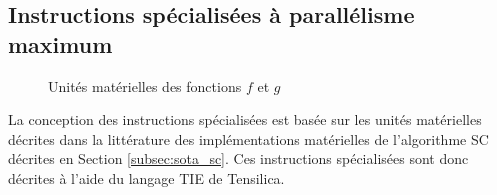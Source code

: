 \subsection{Instructions spécialisées à parallélisme maximum}
\begin{figure}[t]
  \centering
  \caption{Unités matérielles des fonctions $f$ et $g$}
\end{figure}
La conception des instructions spécialisées est basée sur les unités matérielles décrites dans la littérature des implémentations matérielles de l'algorithme SC décrites en Section \ref{subsec:sota_sc}. Ces instructions spécialisées sont donc décrites à l'aide du langage TIE de Tensilica.
